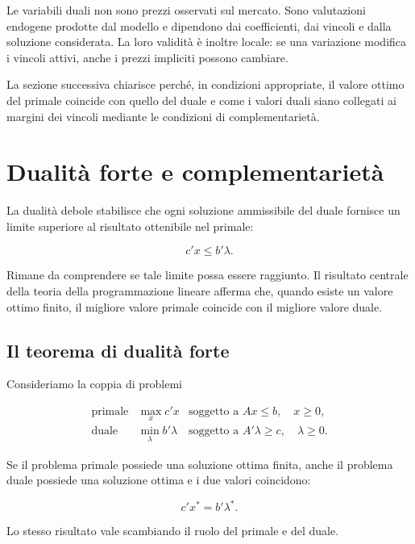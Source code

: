 Le variabili duali non sono prezzi osservati sul mercato. Sono valutazioni
endogene prodotte dal modello e dipendono dai coefficienti, dai vincoli e
dalla soluzione considerata. La loro validit\`{a} \`{e} inoltre locale: se una
variazione modifica i vincoli attivi, anche i prezzi impliciti possono
cambiare.

La sezione successiva chiarisce perch\'{e}, in condizioni appropriate, il
valore ottimo del primale coincide con quello del duale e come i valori duali
siano collegati ai margini dei vincoli mediante le condizioni di
complementariet\`{a}.

\section{Dualit\`a forte e complementariet\`a}

\label{sec:cap11-dualita-forte}

La dualit\`a debole stabilisce che ogni soluzione ammissibile del duale
fornisce un limite superiore al risultato ottenibile nel primale:

\[
c'x
\leq
b'\lambda.
\]

Rimane da comprendere se tale limite possa essere raggiunto. Il risultato
centrale della teoria della programmazione lineare afferma che, quando esiste
un valore ottimo finito, il migliore valore primale coincide con il migliore
valore duale.

\subsection{Il teorema di dualit\`a forte}

Consideriamo la coppia di problemi

\[
\begin{array}{lll}
\text{primale}
&
\displaystyle\max_x c'x
&
\text{soggetto a }
Ax\leq b,\quad x\geq0,
\\[6pt]
\text{duale}
&
\displaystyle\min_{\lambda} b'\lambda
&
\text{soggetto a }
A'\lambda\geq c,\quad \lambda\geq0.
\end{array}
\]

\begin{theorem}

Se il problema primale possiede una soluzione ottima finita, anche il
problema duale possiede una soluzione ottima e i due valori coincidono:

\[
c'x^*
=
b'\lambda^*.
\]

Lo stesso risultato vale scambiando il ruolo del primale e del duale.

\end{theorem}

